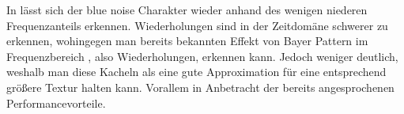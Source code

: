 In  lässt sich der blue noise Charakter wieder anhand des
wenigen niederen Frequenzanteils erkennen. Wiederholungen sind in der Zeitdomäne schwerer zu erkennen,
wohingegen man bereits bekannten Effekt von Bayer Pattern im Frequenzbereich , also Wiederholungen,
erkennen kann. Jedoch weniger deutlich, weshalb man diese Kacheln als eine gute Approximation für eine
entsprechend größere Textur halten kann. Vorallem in Anbetracht der bereits angesprochenen 
Performancevorteile.
